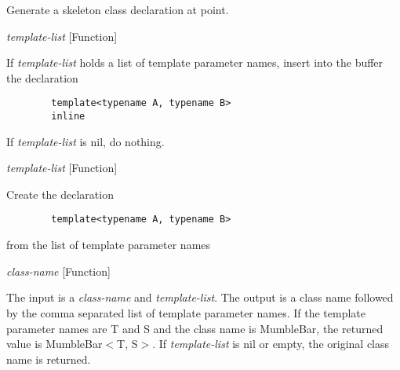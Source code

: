 \begin{doc-string}
Generate a skeleton class declaration at point.
\end{doc-string}

\vspace{1em}
\noindent
{}
\usebox{\funcname}\emph{template-list}
 \hfill [Function]

\begin{doc-string}
If \emph{template-list} holds a list of template parameter names, insert into the
buffer the declaration

\small{\begin{verbatim}
        template<typename A, typename B>
        inline
\end{verbatim}}

If \emph{template-list}  is nil, do nothing.
\end{doc-string}

\vspace{1em}
\noindent
{}
\usebox{\funcname}\emph{template-list}
 \hfill [Function]

\begin{doc-string}
Create the declaration

\small{\begin{verbatim}
        template<typename A, typename B>
\end{verbatim}}

from the list of template parameter names
\end{doc-string}

\vspace{1em}
\noindent
{}
\usebox{\funcname}\emph{class-name}
 \hfill [Function]
\hspace*{\wd\funcname}

\begin{doc-string}
The input is a \emph{class-name} and \emph{template-list}.  The output is a class name
followed by the comma separated list of template parameter names.  If the
template parameter names are T and S and the class name is MumbleBar, the
returned value is MumbleBar$<$T, S$>$.  If \emph{template-list} is nil or empty,
the original class name is returned.
\end{doc-string}

